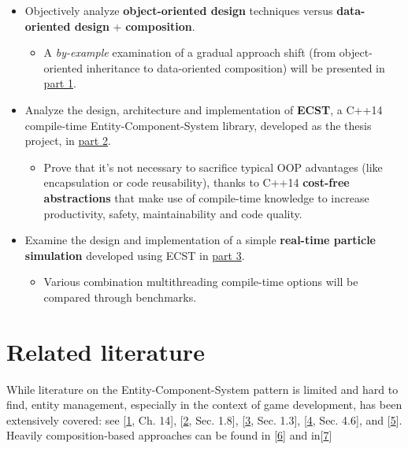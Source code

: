 \documentclass[twoside, 12pt, a4paper, openany]{book}
\providecommand{\tightlist}{%
  \setlength{\itemsep}{0pt}\setlength{\parskip}{0pt}}
\begin{document}
\begin{itemize}
\item
  Objectively analyze \textbf{object-oriented design} techniques versus
  \textbf{data-oriented design} + \textbf{composition}.

  \begin{itemize}
  \tightlist
  \item
    A \emph{by-example} examination of a gradual approach shift (from
    object-oriented inheritance to data-oriented composition) will be
    presented in \protect\hyperlink{ecs_part_overview}{part 1}.
  \end{itemize}
\item
  Analyze the design, architecture and implementation of \textbf{ECST},
  a C++14 compile-time Entity-Component-System library, developed as the
  thesis project, in \protect\hyperlink{part2_ecst}{part 2}.

  \begin{itemize}
  \tightlist
  \item
    Prove that it's not necessary to sacrifice typical OOP advantages
    (like encapsulation or code reusability), thanks to C++14
    \textbf{cost-free abstractions} that make use of compile-time
    knowledge to increase productivity, safety, maintainability and code
    quality.
  \end{itemize}
\item
  Examine the design and implementation of a simple \textbf{real-time
  particle simulation} developed using ECST in
  \protect\hyperlink{part3_sim}{part 3}.

  \begin{itemize}
  \tightlist
  \item
    Various combination multithreading compile-time options will be
    compared through benchmarks.
  \end{itemize}
\end{itemize}

\section{Related literature}\label{related-literature}

While literature on the Entity-Component-System pattern is limited and
hard to find, entity management, especially in the context of game
development, has been extensively covered: see
{[}\protect\hyperlink{ref-gregory2014game}{1}, Ch. 14{]},
{[}\protect\hyperlink{ref-game_programming_gems_4}{2}, Sec. 1.8{]},
{[}\protect\hyperlink{ref-game_programming_gems_5}{3}, Sec. 1.3{]},
{[}\protect\hyperlink{ref-game_programming_gems_6}{4}, Sec. 4.6{]}, and
{[}\protect\hyperlink{ref-doherty2003software}{5}{]}. Heavily
composition-based approaches can be found in
{[}\protect\hyperlink{ref-Wiebusch:2012}{6}{]} and
in{[}\protect\hyperlink{ref-6658092}{7}{]}
\end{document}
